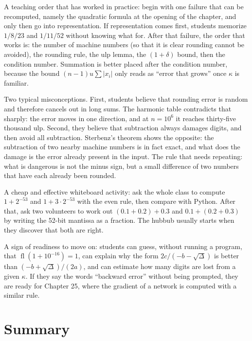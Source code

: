 \begin{untukdosen}
A teaching order that has worked in practice: begin with one failure that can be
recomputed, namely the quadratic formula at the opening of the chapter, and only then go
into representation. If representation comes first, students memorize $1/8/23$ and
$1/11/52$ without knowing what for. After that failure, the order that works is: the
number of machine numbers (so that it is clear rounding cannot be avoided), the rounding
rule, the ulp lemma, the $(1+\delta)$ bound, then the condition number. Summation is
better placed after the condition number, because the bound $(n-1)u\sum|x_{i}|$ only
reads as ``error that grows'' once $\kappa$ is familiar.

Two typical misconceptions. First, students believe that rounding error is random and
therefore cancels out in long sums. The harmonic table contradicts that sharply: the
error moves in one direction, and at $n=10^{6}$ it reaches thirty-five thousand ulp.
Second, they believe that subtraction always damages digits, and then avoid all
subtraction. Sterbenz's theorem shows the opposite: the subtraction of two nearby machine
numbers is in fact exact, and what does the damage is the error already present in the
input. The rule that needs repeating: what is dangerous is not the minus sign, but a
small difference of two numbers that have each already been rounded.

A cheap and effective whiteboard activity: ask the whole class to compute
$1+2^{-53}$ and $1+3\cdot2^{-53}$ with the even rule, then compare with Python.
After that, ask two volunteers to work out
$(0.1+0.2)+0.3$ and $0.1+(0.2+0.3)$ by writing the 52-bit mantissa
as a fraction. The hubbub usually starts when they discover that both are right.

A sign of readiness to move on: students can guess, without running a program, that
$\operatorname{fl}(1+10^{-16})=1$, can explain why the form
$2c/(-b-\sqrt{\Delta})$ is better than $(-b+\sqrt{\Delta})/(2a)$, and can
estimate how many digits are lost from a given $\kappa$. If
they say the words ``backward error'' without being prompted, they are ready for Chapter 25,
where the gradient of a network is computed with a similar rule.
\end{untukdosen}

\section{Summary}


